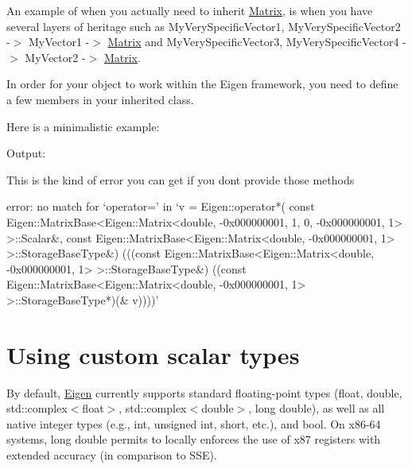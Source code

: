 An example of when you actually need to inherit \hyperlink{group___core___module_class_eigen_1_1_matrix}{Matrix}, is when you have several layers of heritage such as My\+Very\+Specific\+Vector1, My\+Very\+Specific\+Vector2 -\/$>$ My\+Vector1 -\/$>$ \hyperlink{group___core___module_class_eigen_1_1_matrix}{Matrix} and My\+Very\+Specific\+Vector3, My\+Very\+Specific\+Vector4 -\/$>$ My\+Vector2 -\/$>$ \hyperlink{group___core___module_class_eigen_1_1_matrix}{Matrix}.

In order for your object to work within the Eigen framework, you need to define a few members in your inherited class.

Here is a minimalistic example\+:


\begin{DoxyCodeInclude}
\end{DoxyCodeInclude}


Output\+: 
\begin{DoxyVerbInclude}
\end{DoxyVerbInclude}


This is the kind of error you can get if you don\textquotesingle{}t provide those methods \begin{DoxyVerb}error: no match for ‘operator=’ in ‘v = Eigen::operator*(
const Eigen::MatrixBase<Eigen::Matrix<double, -0x000000001, 1, 0, -0x000000001, 1> >::Scalar&, 
const Eigen::MatrixBase<Eigen::Matrix<double, -0x000000001, 1> >::StorageBaseType&)
(((const Eigen::MatrixBase<Eigen::Matrix<double, -0x000000001, 1> >::StorageBaseType&)
((const Eigen::MatrixBase<Eigen::Matrix<double, -0x000000001, 1> >::StorageBaseType*)(& v))))’
\end{DoxyVerb}
 \hypertarget{TopicCustomizing_CustomScalar}{}\section{Using custom scalar types}\label{TopicCustomizing_CustomScalar}
\label{_topic_customizing__custom_scalar_user_defined_scalars}%
%
 By default, \hyperlink{namespace_eigen}{Eigen} currently supports standard floating-\/point types ({\ttfamily float}, {\ttfamily double}, {\ttfamily std\+::complex$<$float$>$}, {\ttfamily std\+::complex$<$double$>$}, {\ttfamily long} {\ttfamily double}), as well as all native integer types (e.\+g., {\ttfamily int}, {\ttfamily unsigned} {\ttfamily int}, {\ttfamily short}, etc.), and {\ttfamily bool}. On x86-\/64 systems, {\ttfamily long} {\ttfamily double} permits to locally enforces the use of x87 registers with extended accuracy (in comparison to S\+SE).

